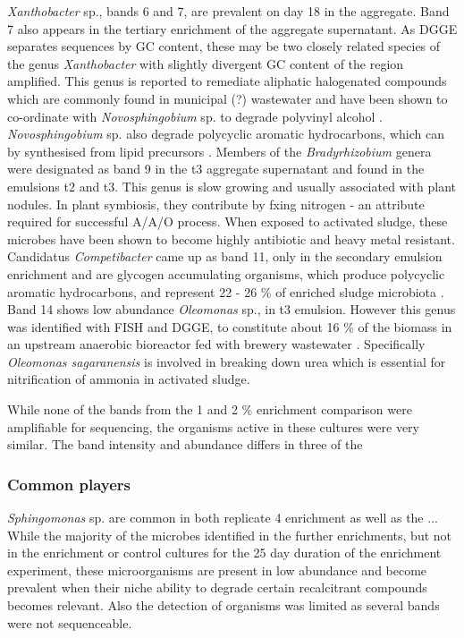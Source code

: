 \documentclass[11pt]{article}
\begin{document}
\emph{Xanthobacter} sp., bands 6 and 7, are prevalent on day 18 in the aggregate. Band 7 also appears in the tertiary enrichment of the aggregate supernatant. As DGGE separates sequences by GC content, these may be two closely related species of the genus \emph{Xanthobacter} with slightly divergent GC content of the region amplified. This genus is reported to remediate aliphatic halogenated compounds which are commonly found in municipal (?) wastewater \cite{janssen1985degradation} and have been shown to co-ordinate with \emph{Novosphingobium} sp. to degrade polyvinyl alcohol \cite{rong2009symbiotic}. \emph{Novosphingobium} sp. also degrade polycyclic aromatic hydrocarbons, which can by synthesised from lipid precursors \cite{addison2007novosphingobium}.
Members of the \emph{Bradyrhizobium} genera were designated as band 9 in the t3 aggregate supernatant and found in the emulsions t2 and t3. This genus is slow growing \cite{rebah2002wastewater} and usually associated with plant nodules. In plant symbiosis, they contribute by fxing nitrogen - an attribute required for successful A/A/O process. When exposed to activated sludge, these microbes have been shown to become highly antibiotic and heavy metal resistant.
Candidatus \emph{Competibacter} came up as band 11, only in the secondary emulsion enrichment and are glycogen accumulating organisms, which produce polycyclic aromatic hydrocarbons, and represent 22 - 26 \% of enriched sludge microbiota \cite{bengtsson2008production,lemaire2008microbial}. 
Band 14 shows low abundance \emph{Oleomonas} sp., in t3 emulsion. However this genus was identified with FISH and DGGE, to constitute about 16 \% of the biomass in an upstream anaerobic bioreactor fed with brewery wastewater \cite{fernandez2008analysis}. Specifically \emph{Oleomonas sagaranensis} is involved in breaking down urea \cite{kanamori2005allophanate,kanamori2004enzymatic} which is essential for nitrification of ammonia in activated sludge.


While none of the bands from the 1 and 2 \% enrichment comparison were amplifiable for sequencing, the organisms active in these cultures were very similar. The band intensity and abundance differs in three of the 

\subsubsection{Common players}
\emph{Sphingomonas} sp. are common in both replicate 4 enrichment as well as the ...
While the majority of the microbes identified in the further enrichments, but not in the enrichment or control cultures for the 25 day duration of the enrichment experiment, these microorganisms are present in low abundance and become prevalent when their niche ability to degrade certain recalcitrant compounds becomes relevant. Also the detection of organisms was limited as several bands were not sequenceable.
\end{document}
